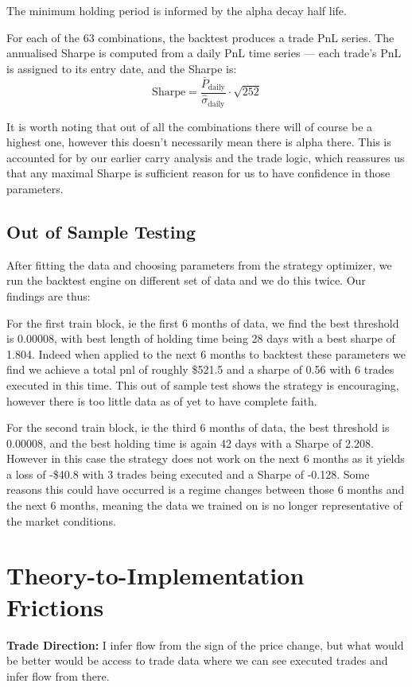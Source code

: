 \documentclass[11pt,a4paper]{article}
\begin{document}
The minimum holding period is informed by the alpha decay half life.

For each of the 63 combinations, the backtest produces a trade PnL series.
The annualised Sharpe is computed from a daily PnL time series --- each
trade's PnL is assigned to its entry date, and the Sharpe is:
\[
    \text{Sharpe} = \frac{\bar{P}_{\text{daily}}}{\hat{\sigma}_{\text{daily}}}
    \cdot \sqrt{252}
\]

It is worth noting that out of all the combinations there will of course be a highest one, however this doesn't necessarily mean there is alpha there. This is accounted for by our earlier carry analysis and the trade logic, which reassures us that any maximal Sharpe is sufficient reason for us to have confidence in those parameters.

\subsection{Out of Sample Testing}

After fitting the data and choosing parameters from the strategy optimizer, we run the backtest engine on different set of data and we do this twice. Our findings are thus:

For the first train block, ie the first 6 months of data, we find the best threshold is 0.00008, with best length of holding time being 28 days with a best sharpe of 1.804. Indeed when applied to the next 6 months to backtest these parameters we find we achieve a total pnl of roughly \$521.5 and a sharpe of 0.56 with 6 trades executed in this time. This out of sample test shows the strategy is encouraging, however there is too little data as of yet to have complete faith.

For the second train block, ie the  third 6 months of data, the best threshold is 0.00008, and the best holding time is again 42 days with a Sharpe of 2.208. However in this case the strategy does not work on the next 6 months as it yields a loss of -\$40.8 with 3 trades being executed and a Sharpe of -0.128. Some reasons this could have occurred is a regime changes between those 6 months and the next 6 months, meaning the data we trained on is no longer representative of the market conditions.


\section{Theory-to-Implementation Frictions}

\textbf{Trade Direction:} I infer flow from the sign of the price change, but what would be better would be access to trade data where we can see executed trades and infer flow from there.
\end{document}
